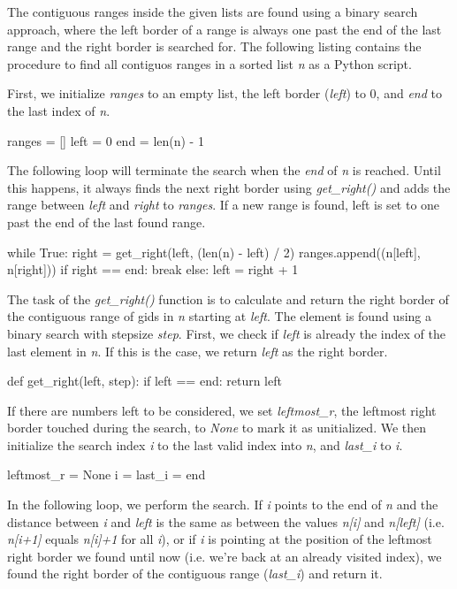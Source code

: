 \documentclass{frontiersSCNS} %
\begin{document}
The contiguous ranges inside the given lists are found using a binary
search approach, where the left border of a range is always one past
the end of the last range and the right border is searched for. The
following listing contains the procedure to find all contiguos ranges
in a sorted list \emph{n} as a Python script.

First, we initialize \emph{ranges} to an empty list, the left border
(\emph{left}) to 0, and \emph{end} to the last index of \emph{n}.

\begin{pythoncode}
ranges = []
left = 0
end = len(n) - 1
\end{pythoncode}

The following loop will terminate the search when the \emph{end} of
\emph{n} is reached. Until this happens, it always finds the next
right border using \emph{get\_right()} and adds the range between
\emph{left} and \emph{right} to \emph{ranges}. If a new range is
found, left is set to one past the end of the last found range.

\begin{pythoncode}
while True:
    right = get_right(left, (len(n) - left) / 2)
    ranges.append((n[left], n[right]))
    if right == end:
        break
    else:
        left = right + 1
\end{pythoncode}

The task of the \emph{get\_right()} function is to calculate and
return the right border of the contiguous range of gids in \emph{n}
starting at \emph{left}. The element is found using a binary search
with stepsize \emph{step}. First, we check if \emph{left} is already
the index of the last element in \emph{n}. If this is the case, we
return \emph{left} as the right border.

\begin{pythoncode}
def get_right(left, step):
    if left == end:
        return left
\end{pythoncode}

If there are numbers left to be considered, we set \emph{leftmost\_r},
the leftmost right border touched during the search, to \emph{None} to
mark it as unitialized. We then initialize the search index \emph{i}
to the last valid index into \emph{n}, and \emph{last\_i} to \emph{i}.

\begin{pythoncode}
    leftmost_r = None
    i = last_i = end
\end{pythoncode}

In the following loop, we perform the search. If \emph{i} points to
the end of \emph{n} and the distance between \emph{i} and \emph{left}
is the same as between the values \emph{n[i]} and \emph{n[left]}
(i.e. \emph{n[i+1]} equals \emph{n[i]+1} for all \emph{i}), or if
\emph{i} is pointing at the position of the leftmost right border we
found until now (i.e. we're back at an already visited index), we
found the right border of the contiguous range (\emph{last\_i}) and
return it.
\end{document}
